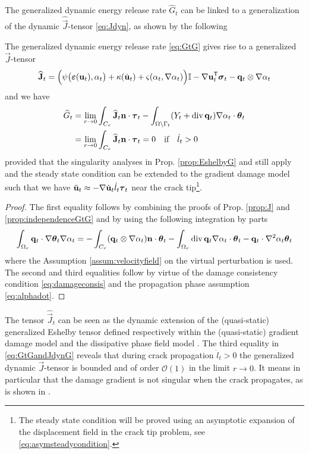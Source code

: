 The generalized dynamic energy release rate $\widehat{G}_t$ can be linked to a generalization of the dynamic $\widehat{\vec{J}}$-tensor \eqref{eq:Jdyn}, as shown by the following
\begin{proposition} \label{prop:EshelbyG}
The generalized dynamic energy release rate \eqref{eq:GtG} gives rise to a generalized $\vec{J}$-tensor
\begin{equation} \label{eq:JdynG}
\widehat{\vec{J}}_t=\Bigl(\psi\bigl(\eps(\vec{u}_t),\alpha_t\bigr)+\kappa(\dot{\vec{u}}_t)+\varsigma(\alpha_t,\nabla\alpha_t)\Bigr)\mathbb{I}-\nabla\vec{u}_t^\mT\sig_t-\vec{q}_t\otimes\nabla\alpha_t
\end{equation}
and we have
\begin{equation} \label{eq:GtGandJdynG}
\begin{aligned}
\widehat{G}_t &= \lim_{r\to 0}\int_{C_r}\widehat{\vec{J}}_t\vec{n}\cdot\vtau_t-\int_\domaint (Y_t+\div\vec{q}_t)\nabla\alpha_t\cdot\vtheta_t \\
&= \lim_{r\to 0}\int_{C_r}\widehat{\vec{J}}_t\vec{n}\cdot\vtau_t=0\quad\text{if}\quad\dot{l}_t>0
\end{aligned}
\end{equation}
provided that the singularity analyses in Prop. \ref{prop:EshelbyG} and \cite{SicsicMarigo:2013} still apply and the steady state condition \cite{Freund:1990} can be extended to the gradient damage model such that we have $\ddot{\vec{u}}_t\approx-\nabla\dot{\vec{u}}_t\dot{l}_t\vtau_t$ near the crack tip\footnote{The steady state condition will be proved using an asymptotic expansion of the displacement field in the crack tip problem, see \eqref{eq:asymsteadycondition}.}.
\end{proposition}

\begin{proof}
The first equality follows by combining the proofs of Prop. \ref{prop:J} and \ref{prop:independenceGtG} and by using the following integration by parts
\[
\int_{\Omega_r}\vec{q}_t\cdot\nabla\vtheta_t\nabla\alpha_t=-\int_{C_r}(\vec{q}_t\otimes\nabla\alpha_t)\vec{n}\cdot\vtheta_t-\int_{\Omega_r}\div\vec{q}_t\nabla\alpha_t\cdot\vtheta_t-\vec{q}_t\cdot\nabla^2\alpha_t\vtheta_t
\]
where the Assumption \ref{assum:velocityfield} on the virtual perturbation is used. The second and third equalities follow by virtue of the damage consistency condition \eqref{eq:damageconsis} and the propagation phase assumption \eqref{eq:alphadot}.
\end{proof}

The tensor $\widehat{\vec{J}}_t$ can be seen as the dynamic extension of the (quasi-static) generalized Eshelby tensor \cite{SicsicMarigo:2013,HakimKarma:2005} defined respectively within the (quasi-static) gradient damage model \cite{PhamMarigo:2010-1} and the dissipative phase field model \cite{KarmaKesslerLevine:2001}. The third equality in \eqref{eq:GtGandJdynG} reveals that during crack propagation $\dot{l}_t>0$ the generalized dynamic $\vec{J}$-tensor is bounded and of order $\mathcal{O}(1)$ in the limit $r\to 0$. It means in particular that the damage gradient is not singular when the crack propagates, as is shown in \cite{SicsicMarigo:2013}.

